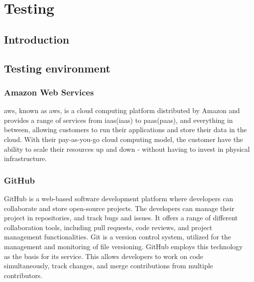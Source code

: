 \chapter{Testing}
\section{Introduction}

\section{Testing environment}

\subsection{Amazon Web Services}
\acrlong{aws}, known as \acrshort{aws}, is a cloud computing platform distributed by Amazon and provides a range of services from \acrlong{iaas}(\acrshort{iaas}) to \acrlong{paas}(\acrshort{paas}), and everything in between, allowing customers to run their applications and store their data in the cloud. With their pay-as-you-go cloud computing model, the customer have the ability to scale their resources up and down - without having to invest in physical infrastructure.\cite{aws}  

\subsection{GitHub}
GitHub is a web-based software development platform where developers can collaborate and store open-source projects. The developers can manage their project in repositories, and track bugs and issues. It offers a range of different collaboration tools, including pull requests, code reviews, and project management functionalities. Git is a version control system, utilized for the management and monitoring of file versioning. GitHub employs this technology as the basis for its service. This allows developers to work on code simultaneously, track changes, and merge contributions from multiple contributors.\cite{github}
